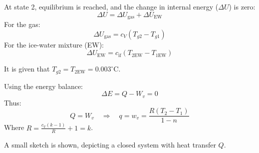 At state 2, equilibrium is reached, and the change in internal energy (\( \Delta U \)) is zero:  
\[
\Delta U = \Delta U_{\text{gas}} + \Delta U_{\text{EW}}
\]  
For the gas:  
\[
\Delta U_{\text{gas}} = c_V (T_{g2} - T_{g1})
\]  
For the ice-water mixture (EW):  
\[
\Delta U_{\text{EW}} = c_{\text{if}} (T_{2\text{EW}} - T_{1\text{EW}})
\]  

It is given that \( T_{g2} = T_{2\text{EW}} = 0.003^\circ\text{C} \).  

Using the energy balance:  
\[
\Delta E = Q - W_v = 0
\]  
Thus:  
\[
Q = W_v \quad \Rightarrow \quad q = w_v = \frac{R(T_2 - T_1)}{1 - n}
\]  
Where \( R = \frac{c_V (k - 1)}{R} + 1 = k \).  

A small sketch is shown, depicting a closed system with heat transfer \( Q \).